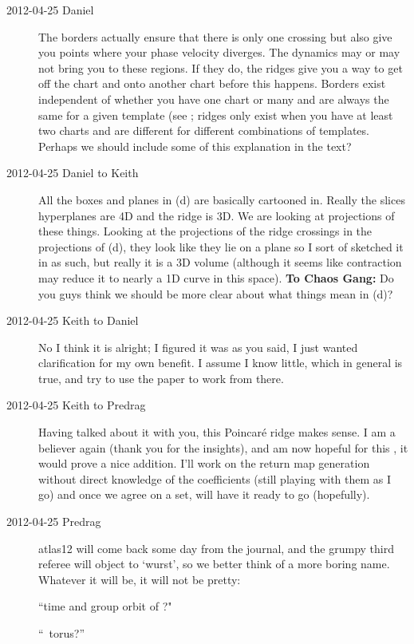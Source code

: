 \begin{description}
\item[2012-04-25 Daniel] The borders actually ensure that there is only one crossing but also give you points where your phase velocity diverges. The dynamics may or may not bring you to these regions. If they do, the ridges give you a way to get off the chart and onto another chart before this happens. Borders exist independent of whether you have one chart or many and are always the same for a given template (see ; ridges only exist when you have at least two charts and are different for different combinations of templates. Perhaps we should include some of this explanation in the text?

\item[2012-04-25 Daniel to Keith] All the boxes and planes in (d) are basically cartooned in. Really the slices hyperplanes are 4D and the ridge is 3D. We are looking at projections of these things. Looking at the projections of the ridge crossings in the projections of (d), they look like they lie on a plane so I sort of sketched it in as such, but really it is a 3D volume (although it seems like contraction may reduce it to nearly a 1D curve in this space). {\bf To Chaos Gang:} Do you guys think we should be more clear about what things mean in (d)?

\item[2012-04-25 Keith to Daniel]  No I think it is alright; I figured it was as you said, I just wanted clarification for my own benefit.  I assume I know little, which in general is true, and try to use the paper to work from there.

\item[2012-04-25 Keith to Predrag]  Having talked about it with you, this
Poincar\'e ridge makes sense.  I am a believer again (thank you for the
insights), and am now hopeful for this {\twoMode}, it would prove a nice
addition.  I'll work on the return map generation without direct
knowledge of the coefficients (still playing with them as I go) and once
we agree on a set, will have it ready to go (hopefully).

\item[2012-04-25 Predrag] atlas12 will come back some day from the
journal, and the grumpy third referee will object to `wurst', so we
better think of a more boring name. Whatever it will be, it will not be
pretty:

``time and group orbit of \ssp?"

``\rpo\ torus?''


\end{description}
